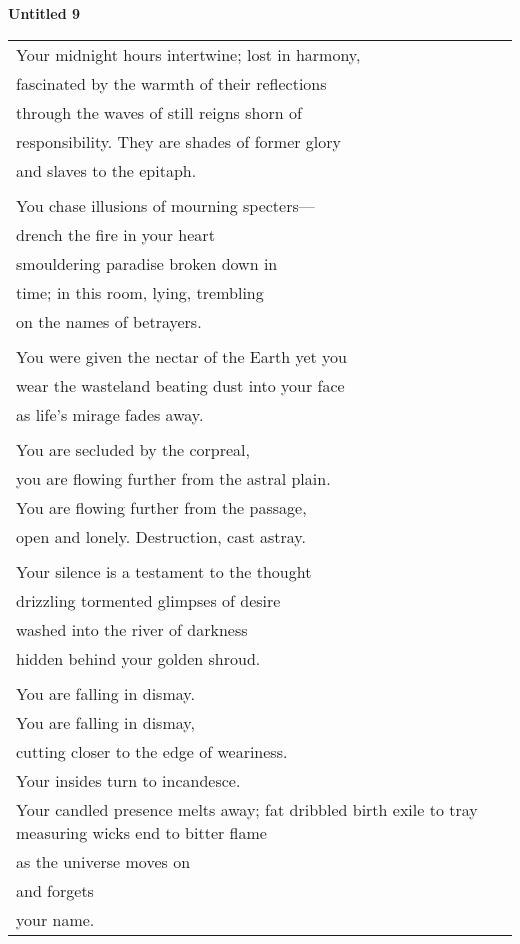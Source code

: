 \documentclass{article}
\begin{document}
\begin{center}
\textbf{Untitled 9} \\
\vspace*{2ex}
\begin{tabular}{l}
Your midnight hours intertwine; lost in harmony, \\
fascinated by the warmth of their reflections \\
through the waves of still reigns shorn of \\
responsibility.  They are shades of former glory \\
and slaves to the epitaph. \\
\\
You chase illusions of mourning specters--- \\
drench the fire in your heart \\
smouldering paradise broken down in \\
time; in this room, lying, trembling \\
on the names of betrayers. \\
\\
You were given the nectar of the Earth yet you \\
wear the wasteland beating dust into your face \\
as life's mirage fades away. \\
\\
You are secluded by the corpreal, \\
you are flowing further from the astral plain. \\ %
You are flowing further from the passage, \\
open and lonely.  Destruction, cast astray. \\
\\
Your silence is a testament to the thought \\
drizzling tormented glimpses of desire \\
washed into the river of darkness \\
hidden behind your golden shroud. \\
\\
You are falling in dismay. \\
You are falling in dismay, \\
cutting closer to the edge of weariness. \\
Your insides turn to incandesce. \\
Your candled presence melts away;
fat dribbled birth exile to tray
measuring wicks end to bitter flame \\
as the universe moves on \\
and forgets \\
your name. \\
\end{tabular}
\end{center}
\end{document}
